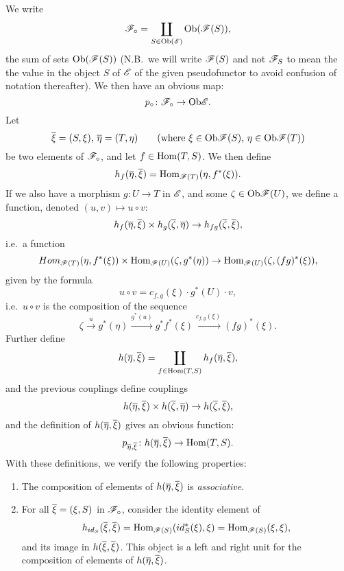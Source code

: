 \documentclass[../main.tex]{subfiles}
\begin{document}
We write 
\[\mathscr{F}_\circ = \coprod_{S \in \mathrm{Ob} (\mathscr{E})} \mathrm{Ob}(\mathscr{F}(S)),\] 
the sum of sets $\mathrm{Ob}(\mathscr{F} (S))$ (N.B.\ we will write $\mathscr{F}(S)$ and not $\mathscr{F}_S$ to mean the the value in the object $S$ of $\mathscr{E}$ of the given pseudofunctor to avoid confusion of notation thereafter).
We then have an obvious map:
\[p_\circ \colon \mathscr{F}_\circ \to \mathrm{Ob} \mathscr{E}.\]
Let 
\[\overline \xi = (S, \xi), \, \overline \eta = (T, \eta) \qquad (\text{where } \xi \in \mathrm{Ob} \mathscr{F}(S), \, \eta \in \mathrm{Ob} \mathscr{F}(T))\]
be two elements of $\mathscr{F}_\circ$, and let $f \in \mathrm{Hom}(T,S)$.
We then define
\[h_f(\overline \eta, \overline \xi) = \mathrm{Hom}_{\mathscr{F}(T)}(\eta, f^\ast(\xi)).\]
If we also have a morphism $g \colon U \to T$ in $\mathscr{E}$, and some $\zeta \in \mathrm{Ob} \mathscr{F} (U)$, we define a function, denoted $(u,v) \mapsto u \circ v$:
\[h_f(\overline \eta, \overline \xi) \times h_g(\overline \zeta, \overline \eta) \to h_{fg}(\overline \zeta, \overline \xi),\]
i.e.\ a function
\[Hom_{\mathscr{F}(T)} (\eta, f^\ast(\xi)) \times \mathrm{Hom}_{\mathscr{F}(U)} (\zeta, g^\ast(\eta)) \to \mathrm{Hom}_{\mathscr{F}(U)} (\zeta, (fg)^\ast(\xi)),\]
given by the formula
\[u \circ v = c_{f,g} (\xi) \cdot g^\ast(U) \cdot v,\]
i.e.\ $u \circ v$ is the composition of the sequence 
\[
\zeta \xrightarrow{u} g^\ast(\eta) \xrightarrow{g^\ast(u)} g^\ast f^\ast(\xi) \xrightarrow{c_{f,g}(\xi)} (fg)^\ast(\xi).\]
Further define
\[
    h(\overline \eta, \overline \xi) = \coprod_{f \in \mathrm{Hom}(T,S)} h_f(\overline \eta, \overline \xi),
\]
and the previous couplings define couplings
\[h(\overline \eta, \overline \xi) \times h(\overline \zeta, \overline \eta) \to h(\overline \zeta, \overline \xi),\]
and the definition of $h (\overline \eta, \overline \xi)$ gives an obvious function:
\[p_{\overline \eta, \overline \xi}
\colon h(\overline \eta, \overline \xi) \to \mathrm{Hom}(T, S).\]
With these definitions, we verify the following properties:
\begin{enumerate}
    \item {}The composition of elements of $h (\overline \eta, \overline \xi)$ is \emph{associative}.
    \item For all $\overline \xi = (\xi, S)$ in $\mathscr{F}_\circ$, consider the identity element of
    \[h_{id_S} (\overline \xi, \overline \xi) = \mathrm{Hom}_{\mathscr{F}(S)} (id_S^\ast(\xi), \xi) = \mathrm{Hom}_{\mathscr{F}(S)}(\xi,\xi),\]
    and its image in $h (\overline \xi,\overline \xi)$.
        This object is a left and right unit for the composition of elements of $h (\overline \eta, \overline \xi)$.
\end{enumerate}
\end{document}
